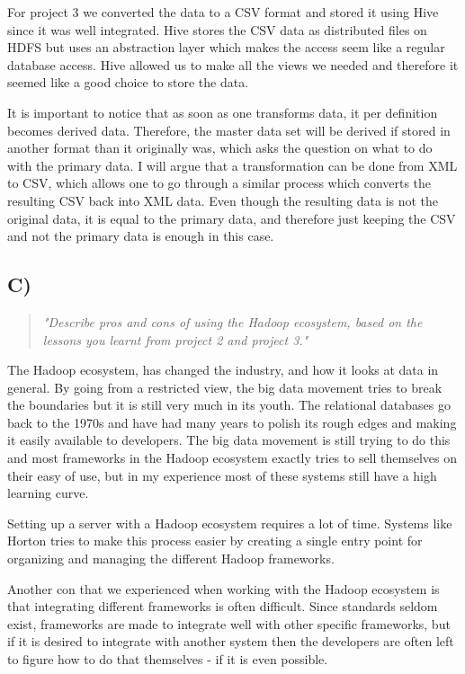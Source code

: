\newpar For project 3 we converted the data to a CSV format and stored it using Hive since it was well integrated. Hive stores the CSV data as distributed files on HDFS but uses an abstraction layer which makes the access seem like a regular database access\cite{hive}. Hive allowed us to make all the views we needed and therefore it seemed like a good choice to store the data. 

It is important to notice that as soon as one transforms data, it per definition becomes derived data. Therefore, the master data set will be derived if stored in another format than it originally was, which asks the question on what to do with the primary data. I will argue that a transformation can be done from XML to CSV, which allows one to go through a similar process which converts the resulting CSV back into XML data. Even though the resulting data is not the original data, it is equal to the primary data, and therefore just keeping the CSV and not the primary data is enough in this case.

\subsection{C)}\label{sec:1C}
\begin{quote}
	\textit{"Describe	pros	and	cons	of	using	the	Hadoop	ecosystem,	based	on	the	lessons	you	learnt	from	project	2	and	project	3."}
\end{quote}
The Hadoop ecosystem, has changed the industry, and how it looks at data in general. By going from a restricted view, the big data movement tries to break the boundaries but it is still very much in its youth. The relational databases go back to the 1970s and have had many years to polish its rough edges and making it easily available to developers. The big data movement is still trying to do this and most frameworks in the Hadoop ecosystem exactly tries to sell themselves on their easy of use, but in my experience most of these systems still have a high learning curve. 

Setting up a server with a Hadoop ecosystem requires a lot of time. Systems like Horton tries to make this process easier by creating a single entry point for organizing and managing the different Hadoop frameworks.

\newpar Another con that we experienced when working with the Hadoop ecosystem is that integrating different frameworks is often difficult. Since standards seldom exist, frameworks are made to integrate well with other specific frameworks, but if it is desired to integrate with another system then the developers are often left to figure how to do that themselves - if it is even possible.

